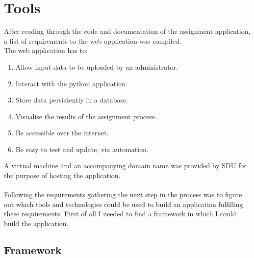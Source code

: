 \section{Tools}\label{tools}

After reading through the code and documentation of the assignment application, a list of requirements to the web application was compiled.
\\The web application has to:
\begin{enumerate}
	\item Allow input data to be uploaded by an administrator.
	\item Interact with the python application.
	\item Store data persistently in a database.
	\item Visualise the results of the assignment process.
	\item Be accessible over the internet.
	\item Be easy to test and update, via automation.
\end{enumerate}
A virtual machine and an accompanying domain name was provided by SDU for the purpose of hosting the application.\\\\
Following the requirements gathering the next step in the process was to figure out which tools and technologies could be used to build an application fulfilling these requirements. First of all I needed to find a framework in which I could build the application.

\subsection{Framework}

